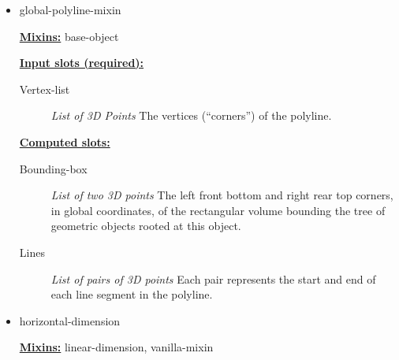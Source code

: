 \documentclass [11pt]{book}
\begin{document}
\begin{itemize}
\begin{figure}
\label{fig:global-polyline}

\end{figure}






\item {}global-polyline-mixin


\textbf{
\underline{Mixins:}} base-object





\begin{description}

\end{description}








\textbf{
\underline{Input slots (required):}}

\begin{description}

\item [Vertex-list]
\emph{List of 3D Points} The vertices (``corners'') of the polyline.


\end{description}






\textbf{
\underline{Computed slots:}}

\begin{description}

\item [Bounding-box]
\emph{List of two 3D points} The left front bottom and right rear top corners, in global coordinates,
of the rectangular volume bounding the tree of geometric objects rooted at this object.


\item [Lines]
\emph{List of pairs of 3D points} Each pair represents the start and end of each line segment in the polyline.


\end{description}







\item {}horizontal-dimension


\textbf{
\underline{Mixins:}} linear-dimension, vanilla-mixin






\end{itemize}
\end{document}
